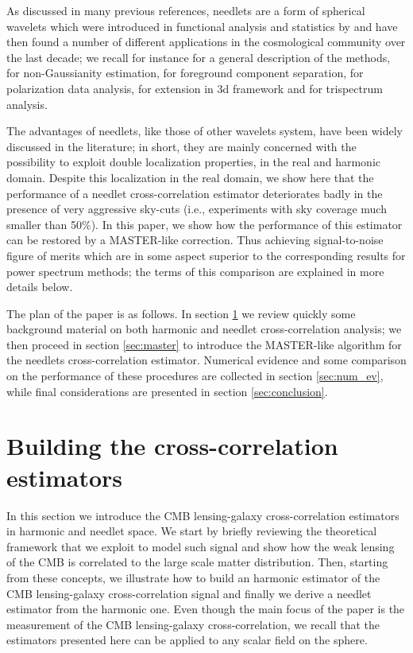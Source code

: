 \documentclass[a4paper,11pt]{article}
\begin{document}
As discussed in many previous references, needlets are a form of spherical wavelets which were 
introduced in functional analysis and statistics by \cite{Narcowich2006,Baldi2009a} and have then found a 
number of different applications in the cosmological community over the last decade; we recall for 
instance \cite{Marinucci2007} for a general description of the methods, 
\cite{Lan2008,Rudjord2009a,Pietrobon2010a,Donzelli2012,Regan2015,Ade:2015ava} for non-Gaussianity 
estimation, \cite{Delabrouille2010,2014A&A...571A..12P,Adam:2015tpy,Rogers2016,Rogers2016a} for 
foreground component separation, \cite{Geller2008,Leistedt2015a,Ade:2015ava} for polarization data 
analysis, 
\cite{Durastanti2014,Leistedt2015} for extension in 3d framework and \cite{Troja2014,Regan2015} for 
trispectrum analysis.

The advantages of needlets, like those of other wavelets system, have been widely discussed in the 
literature; in short, they are mainly concerned with the possibility to exploit double localization properties, 
in the real and harmonic domain. Despite this localization in the real domain, we show here that the 
performance of a needlet cross-correlation estimator deteriorates badly in the presence of very aggressive 
sky-cuts (i.e., experiments with sky coverage much smaller than 50\%). In this paper, we show how the 
performance of this estimator can be restored by a MASTER-like correction. Thus achieving 
signal-to-noise figure of merits which are in some aspect superior to the corresponding results for power 
spectrum methods; the terms of this comparison are explained in more details below. 

The plan of the paper is as follows. In section \ref{sec:theo} we review quickly some background material 
on both harmonic and needlet cross-correlation analysis; we then proceed in section \ref{sec:master} to 
introduce the MASTER-like algorithm for the needlets cross-correlation estimator. Numerical evidence and 
some comparison on the performance of these procedures are collected in section \ref{sec:num_ev}, 
while final considerations are presented in section \ref{sec:conclusion}.

\section{Building the cross-correlation estimators}
\label{sec:theo}
In this section we introduce the CMB lensing-galaxy cross-correlation estimators in harmonic and 
needlet space.
We start by briefly reviewing the theoretical framework that we exploit to model such signal and show
how the weak lensing of the CMB is correlated to the large scale matter distribution. Then, starting from
these concepts, we illustrate how to build an harmonic estimator of the CMB lensing-galaxy 
cross-correlation signal and finally we derive a needlet estimator from the harmonic one. Even though
the main focus of the paper is the measurement of the CMB lensing-galaxy cross-correlation,
we recall that the estimators presented here can be applied to any scalar field on the sphere.
\end{document}
